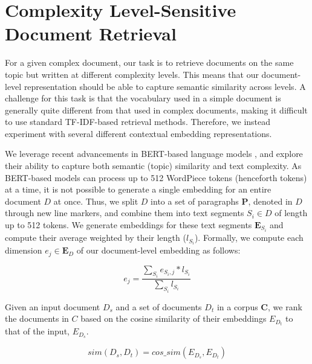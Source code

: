 \documentclass[thesis.tex]{subfiles}
\begin{document}
\section{Complexity Level-Sensitive Document Retrieval} \label{sec:retrieval}

For a given complex document, our task is to retrieve documents on the same topic but written at different complexity levels. This means that our document-level representation should be able to capture semantic similarity across levels. A challenge for this task is that the vocabulary used in a simple document is generally quite different from that used in complex documents, making it difficult to use standard TF-IDF-based retrieval methods. Therefore, we instead experiment with several different contextual embedding representations.

We leverage recent advancements in BERT-based language models \citep{devlin2019bert,reimers2019sentence}, and explore their ability to capture both semantic (topic) similarity and text complexity. As BERT-based models can process up to 512 WordPiece tokens (henceforth tokens) at a time, it is not possible to generate a single embedding for an entire document $D$ at once. Thus, we split $D$ into a set of paragraphs \textbf{P}, denoted in $D$ through new line markers, and combine them into text segments $S_i \in D$ of length up to 512 tokens. We generate embeddings for these text segments $\textbf{E}_{S_i}$ and compute their average weighted by their length ($l_{S_i}$). Formally, we compute each dimension $e_j \in \textbf{E}_D$ of our document-level embedding as follows:

\begin{equation*}
e_j = \frac{\sum_{S_i} e_{S_i, j} * l_{S_i}}{\sum_{S_i} l_{S_i}}
\end{equation*}

\noindent Given an input document $D_s$ and a set of documents $D_t$ in a corpus $\textbf{C}$, we rank the documents in $C$ based on the cosine similarity of their embeddings $E_{D_t}$ to that of the input, $E_{D_s}$.

\begin{equation*}
    sim(D_{s}, D_{t}) = cos\_sim(E_{D_s}, E_{D_t})
\end{equation*}
\end{document}
